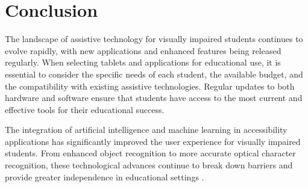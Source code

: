 \section{Conclusion}
\label{sec:conclusion-tablets}
The landscape of assistive technology for visually impaired students continues to evolve rapidly, with new applications and enhanced features being released regularly. When selecting tablets and applications for educational use, it is essential to consider the specific needs of each student, the available budget, and the compatibility with existing assistive technologies. Regular updates to both hardware and software ensure that students have access to the most current and effective tools for their educational success.

The integration of artificial intelligence and machine learning in accessibility applications has significantly improved the user experience for visually impaired students. From enhanced object recognition to more accurate optical character recognition, these technological advances continue to break down barriers and provide greater independence in educational settings \supercite{Bigham2014}.

